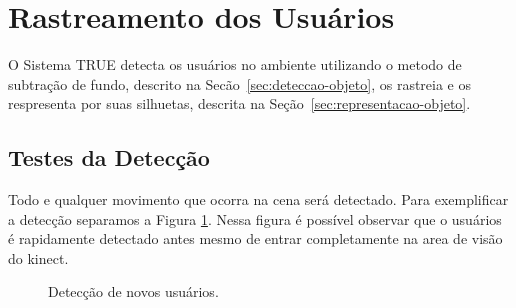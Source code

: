 \section{Rastreamento dos Usuários}

	O Sistema TRUE detecta os usuários no ambiente utilizando o metodo de subtração
	de fundo, descrito na Secão~\ref{sec:deteccao-objeto}, os rastreia e os
	respresenta por suas silhuetas, descrita na	Seção~\ref{sec:representacao-objeto}.
	
	\subsection{Testes da Detecção}
	
		Todo e qualquer movimento que ocorra na cena será detectado. Para exemplificar
		a detecção separamos a Figura \ref{fig:testes_deteccao}. Nessa figura é
		possível observar que o usuários é rapidamente detectado antes mesmo de entrar
		completamente na area de visão do kinect.
		
		\begin{figure}[H]
			\begin{center}
			\end{center}
			\caption{Detecção de novos usuários.}
			\label{fig:testes_deteccao}
		\end{figure}
		
